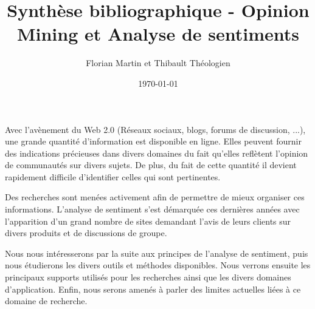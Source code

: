 \documentclass[8pt]{article}
\title{Synthèse bibliographique - Opinion Mining et Analyse de sentiments}
\author{Florian Martin et Thibault Théologien}
\date{\today}
\begin{document}
  \maketitle
  \begin{multicols}{2}

\par Avec l’avènement du Web 2.0 (Réseaux sociaux, blogs, forums de discussion, ...), une grande quantité d’information est disponible en ligne. Elles peuvent fournir des indications précieuses dans divers domaines du fait qu’elles reflètent l’opinion de communautés sur divers sujets. De plus, du fait de cette quantité il devient rapidement difficile d’identifier celles qui sont pertinentes.
\par Des recherches sont menées activement afin de permettre de mieux organiser ces informations. L’analyse de sentiment s’est démarquée ces dernières années avec l’apparition d’un grand nombre de sites demandant l’avis de leurs clients sur divers produits et de discussions de groupe.
\par Nous nous intéresserons par la suite aux principes de l’analyse de sentiment, puis nous étudierons les divers outils et méthodes disponibles. Nous verrons ensuite les principaux supports utilisés pour les recherches ainsi que les divers domaines d’application. Enfin, nous serons amenés à parler des limites actuelles liées à ce domaine de recherche.


\end{multicols}
\end{document}
